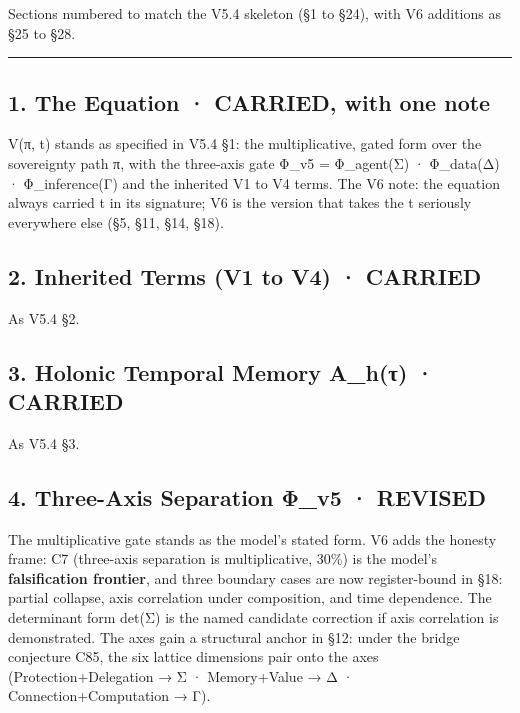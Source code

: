 \documentclass[
]{article}
\begin{document}
Sections numbered to match the V5.4 skeleton (§1 to §24), with V6
additions as §25 to §28.

\begin{center}\rule{0.5\linewidth}{0.5pt}\end{center}

\subsection{1. The Equation · CARRIED, with one
note}\label{the-equation-carried-with-one-note}

V(π, t) stands as specified in V5.4 §1: the multiplicative, gated form
over the sovereignty path π, with the three-axis gate Φ\_v5 =
Φ\_agent(Σ) · Φ\_data(Δ) · Φ\_inference(Γ) and the inherited V1 to V4
terms. The V6 note: the equation always carried t in its signature; V6
is the version that takes the t seriously everywhere else (§5, §11, §14,
§18).

\subsection{2. Inherited Terms (V1 to V4) ·
CARRIED}\label{inherited-terms-v1-to-v4-carried}

As V5.4 §2.

\subsection{3. Holonic Temporal Memory A\_h(τ) ·
CARRIED}\label{holonic-temporal-memory-a_hux3c4-carried}

As V5.4 §3.

\subsection{4. Three-Axis Separation Φ\_v5 ·
REVISED}\label{three-axis-separation-ux3c6_v5-revised}

The multiplicative gate stands as the model's stated form. V6 adds the
honesty frame: C7 (three-axis separation is multiplicative, 30\%) is the
model's \textbf{falsification frontier}, and three boundary cases are
now register-bound in §18: partial collapse, axis correlation under
composition, and time dependence. The determinant form det(Σ) is the
named candidate correction if axis correlation is demonstrated. The axes
gain a structural anchor in §12: under the bridge conjecture C85, the
six lattice dimensions pair onto the axes (Protection+Delegation → Σ ·
Memory+Value → Δ · Connection+Computation → Γ).
\end{document}
